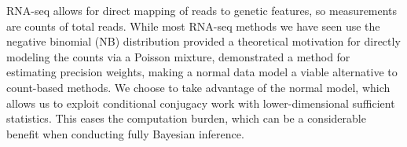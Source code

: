 RNA-seq allows for direct mapping of reads to genetic features, so measurements are counts of total reads. While most RNA-seq methods we have seen use the negative binomial (NB) distribution \citet{mccarthy} provided a theoretical motivation for directly modeling the counts via a Poisson mixture, \citet{voom} demonstrated a method for estimating precision weights, making a normal data model a viable alternative to count-based methods. We choose to take advantage of the normal model, which allows us to exploit conditional conjugacy work with lower-dimensional sufficient statistics. This eases the computation burden, which can be a considerable benefit when conducting fully Bayesian inference.
%




